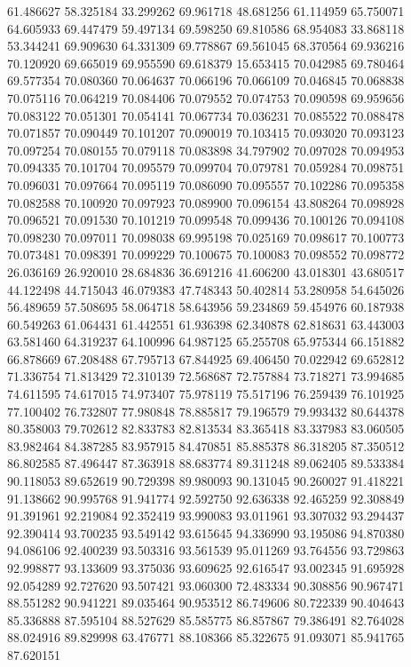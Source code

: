 61.486627
58.325184
33.299262
69.961718
48.681256
61.114959
65.750071
64.605933
69.447479
59.497134
69.598250
69.810586
68.954083
33.868118
53.344241
69.909630
64.331309
69.778867
69.561045
68.370564
69.936216
70.120920
69.665019
69.955590
69.618379
15.653415
70.042985
69.780464
69.577354
70.080360
70.064637
70.066196
70.066109
70.046845
70.068838
70.075116
70.064219
70.084406
70.079552
70.074753
70.090598
69.959656
70.083122
70.051301
70.054141
70.067734
70.036231
70.085522
70.088478
70.071857
70.090449
70.101207
70.090019
70.103415
70.093020
70.093123
70.097254
70.080155
70.079118
70.083898
34.797902
70.097028
70.094953
70.094335
70.101704
70.095579
70.099704
70.079781
70.059284
70.098751
70.096031
70.097664
70.095119
70.086090
70.095557
70.102286
70.095358
70.082588
70.100920
70.097923
70.089900
70.096154
43.808264
70.098928
70.096521
70.091530
70.101219
70.099548
70.099436
70.100126
70.094108
70.098230
70.097011
70.098038
69.995198
70.025169
70.098617
70.100773
70.073481
70.098391
70.099229
70.100675
70.100083
70.098552
70.098772
26.036169
26.920010
28.684836
36.691216
41.606200
43.018301
43.680517
44.122498
44.715043
46.079383
47.748343
50.402814
53.280958
54.645026
56.489659
57.508695
58.064718
58.643956
59.234869
59.454976
60.187938
60.549263
61.064431
61.442551
61.936398
62.340878
62.818631
63.443003
63.581460
64.319237
64.100996
64.987125
65.255708
65.975344
66.151882
66.878669
67.208488
67.795713
67.844925
69.406450
70.022942
69.652812
71.336754
71.813429
72.310139
72.568687
72.757884
73.718271
73.994685
74.611595
74.617015
74.973407
75.978119
75.517196
76.259439
76.101925
77.100402
76.732807
77.980848
78.885817
79.196579
79.993432
80.644378
80.358003
79.702612
82.833783
82.813534
83.365418
83.337983
83.060505
83.982464
84.387285
83.957915
84.470851
85.885378
86.318205
87.350512
86.802585
87.496447
87.363918
88.683774
89.311248
89.062405
89.533384
90.118053
89.652619
90.729398
89.980093
90.131045
90.260027
91.418221
91.138662
90.995768
91.941774
92.592750
92.636338
92.465259
92.308849
91.391961
92.219084
92.352419
93.990083
93.011961
93.307032
93.294437
92.390414
93.700235
93.549142
93.615645
94.336990
93.195086
94.870380
94.086106
92.400239
93.503316
93.561539
95.011269
93.764556
93.729863
92.998877
93.133609
93.375036
93.609625
92.616547
93.002345
91.695928
92.054289
92.727620
93.507421
93.060300
72.483334
90.308856
90.967471
88.551282
90.941221
89.035464
90.953512
86.749606
80.722339
90.404643
85.336888
87.595104
88.527629
85.585775
86.857867
79.386491
82.764028
88.024916
89.829998
63.476771
88.108366
85.322675
91.093071
85.941765
87.620151

